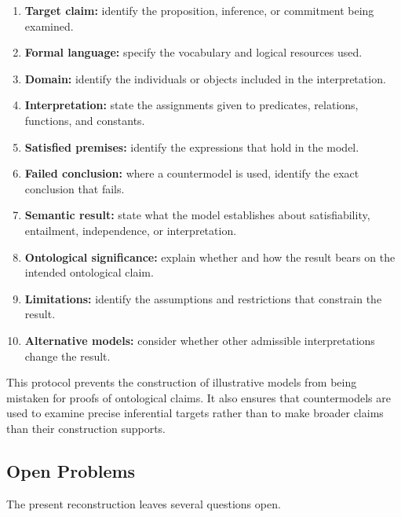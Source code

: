 \begin{enumerate}
    \item \textbf{Target claim:} identify the proposition,
    inference, or commitment being examined.

    \item \textbf{Formal language:} specify the vocabulary
    and logical resources used.

    \item \textbf{Domain:} identify the individuals or
    objects included in the interpretation.

    \item \textbf{Interpretation:} state the assignments
    given to predicates, relations, functions, and
    constants.

    \item \textbf{Satisfied premises:} identify the
    expressions that hold in the model.

    \item \textbf{Failed conclusion:} where a countermodel
    is used, identify the exact conclusion that fails.

    \item \textbf{Semantic result:} state what the model
    establishes about satisfiability, entailment,
    independence, or interpretation.

    \item \textbf{Ontological significance:} explain
    whether and how the result bears on the intended
    ontological claim.

    \item \textbf{Limitations:} identify the assumptions
    and restrictions that constrain the result.

    \item \textbf{Alternative models:} consider whether
    other admissible interpretations change the result.
\end{enumerate}

This protocol prevents the construction of illustrative
models from being mistaken for proofs of ontological
claims. It also ensures that countermodels are used
to examine precise inferential targets rather than
to make broader claims than their construction
supports.

\subsection{Open Problems}

The present reconstruction leaves several questions
open.

